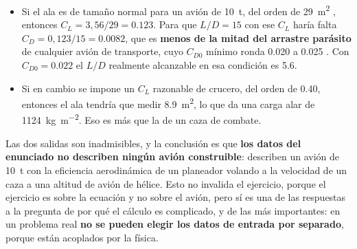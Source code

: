 \documentclass[11pt,letterpaper]{article}
\begin{document}
\begin{itemize}
\item Si el ala es de tamaño normal para un avión de \SI{10}{\tonne}, del orden
  de \SI{29}{\meter\squared} \parencite{learjet75}, entonces
  \(C_L = 3{,}56/29 = \num{0.123}\). Para que \(L/D = 15\) con ese
  \(C_L\) haría falta \(C_D = 0{,}123/15 = \num{0.0082}\), que es
  \textbf{menos de la mitad del arrastre parásito} de cualquier avión de
  transporte, cuyo \(C_{D0}\) mínimo ronda \num{0.020} a \num{0.025}
  \parencite{anderson1999,raymer2018}. Con \(C_{D0} = \num{0.022}\) el
  \(L/D\) realmente alcanzable en esa condición es \num{5.6}.
\item Si en cambio se impone un \(C_L\) razonable de crucero, del orden de
  \num{0.40}, entonces el ala tendría que medir \SI{8.9}{\meter\squared}, lo
  que da una carga alar de \SI{1124}{\kilogram\per\meter\squared}. Eso es más
  que la de un caza de combate.
\end{itemize}

Las dos salidas son inadmisibles, y la conclusión es que \textbf{los datos del
enunciado no describen ningún avión construible}: describen un avión de
\SI{10}{\tonne} con la eficiencia aerodinámica de un planeador volando a la
velocidad de un caza a una altitud de avión de hélice. Esto no invalida el
ejercicio, porque el ejercicio es sobre la ecuación y no sobre el avión, pero sí
es una de las respuestas a la pregunta de por qué el cálculo es complicado, y de
las más importantes: en un problema real \textbf{no se pueden elegir los datos
de entrada por separado}, porque están acoplados por la física.
\end{document}
